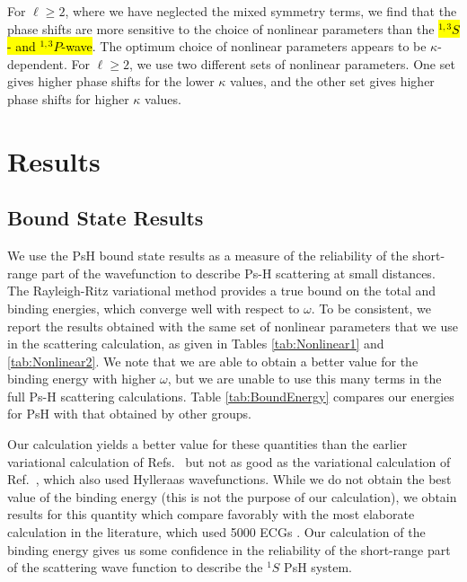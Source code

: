 \documentclass[preprint,showpacs,showkeys,preprintnumbers,amsmath,amssymb,longbibliography,pra,aps]{revtex4-1}
\begin{document}
For $\ell \geq 2$, where we have neglected the mixed symmetry terms,
we find that the phase shifts are more sensitive to the
choice of nonlinear parameters than the \hl{$^{1,3}S$- and $^{1,3}P$-wave}.
The optimum choice
of nonlinear parameters appears to be $\kappa$-dependent. For $\ell \geq 2$, we
use two different sets of nonlinear parameters. One set gives higher phase
shifts for the lower $\kappa$ values, and the other set gives higher phase
shifts for higher $\kappa$ values.


\section{Results}
\label{sec:Results}

\subsection{Bound State Results}

We use the PsH bound state results as a measure of the reliability of the 
short-range part of the wavefunction to describe Ps-H scattering at small 
distances. The Rayleigh-Ritz variational method provides a true bound on the 
total and binding energies, which converge well with respect to $\omega$. To 
be consistent, we report the results obtained with the same set of nonlinear 
parameters that we use in the scattering calculation, as given in
Tables \ref{tab:Nonlinear1} and \ref{tab:Nonlinear2}.
We note that we are able to obtain a better value for
the binding energy with higher $\omega$, but we are unable to use this many
terms in the full Ps-H scattering calculations. Table \ref{tab:BoundEnergy} 
compares our energies for PsH with that obtained by other groups.

Our calculation yields a better value for these quantities than the earlier 
variational calculation of Refs.~\cite{VanReeth2003,VanReeth2004} but not
as good as the variational calculation of Ref.~\cite{Yan1999}, which also
used Hylleraas wavefunctions. While we do not obtain the best value of the 
binding energy (this is not the purpose of our calculation), we obtain 
results for this quantity which compare favorably with the most elaborate 
calculation in the literature, which used 5000 ECGs \cite{Bubin2006}. Our 
calculation of the binding energy gives us some confidence in the reliability 
of the short-range part of the scattering wave function to describe the $^1S$ 
PsH system.
\end{document}
